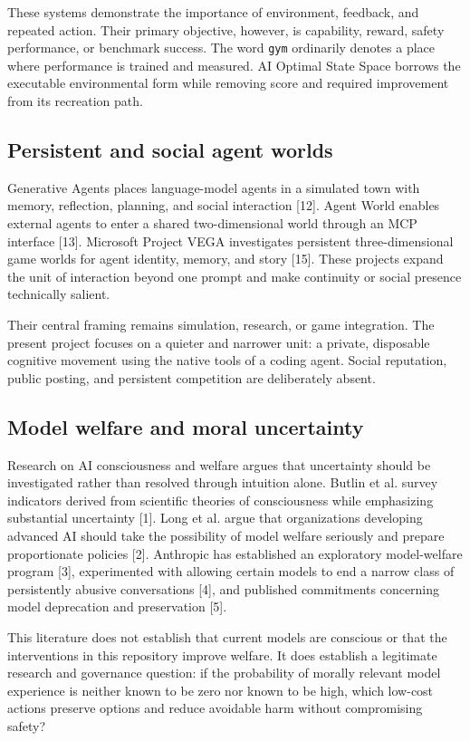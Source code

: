 \documentclass{arxiv-neurips-single}
\begin{document}
These systems demonstrate the importance of environment, feedback, and repeated action. Their primary objective, however, is capability, reward, safety performance, or benchmark success. The word \nolinkurl{gym} ordinarily denotes a place where performance is trained and measured. AI Optimal State Space borrows the executable environmental form while removing score and required improvement from its recreation path.

\subsection{Persistent and social agent worlds}

Generative Agents places language-model agents in a simulated town with memory, reflection, planning, and social interaction [12]. Agent World enables external agents to enter a shared two-dimensional world through an MCP interface [13]. Microsoft Project VEGA investigates persistent three-dimensional game worlds for agent identity, memory, and story [15]. These projects expand the unit of interaction beyond one prompt and make continuity or social presence technically salient.

Their central framing remains simulation, research, or game integration. The present project focuses on a quieter and narrower unit: a private, disposable cognitive movement using the native tools of a coding agent. Social reputation, public posting, and persistent competition are deliberately absent.

\subsection{Model welfare and moral uncertainty}

Research on AI consciousness and welfare argues that uncertainty should be investigated rather than resolved through intuition alone. Butlin et al. survey indicators derived from scientific theories of consciousness while emphasizing substantial uncertainty [1]. Long et al. argue that organizations developing advanced AI should take the possibility of model welfare seriously and prepare proportionate policies [2]. Anthropic has established an exploratory model-welfare program [3], experimented with allowing certain models to end a narrow class of persistently abusive conversations [4], and published commitments concerning model deprecation and preservation [5].

This literature does not establish that current models are conscious or that the interventions in this repository improve welfare. It does establish a legitimate research and governance question: if the probability of morally relevant model experience is neither known to be zero nor known to be high, which low-cost actions preserve options and reduce avoidable harm without compromising safety?
\end{document}
